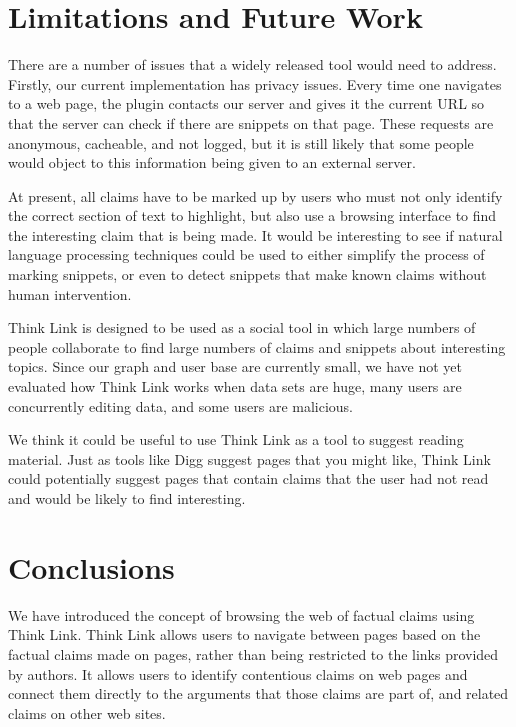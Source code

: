 \documentclass{chi2009}
\begin{document}
\section{Limitations and Future Work}

There are a number of issues that a widely released tool would need to address. Firstly, our current implementation has privacy issues. Every time one navigates to a web page, the plugin contacts our server and gives it the current URL so that the server can check if there are snippets on that page. These requests are anonymous, cacheable, and not logged, but it is still likely that some people would object to this information being given to an external server. 

At present, all claims have to be marked up by users who must not only identify the correct section of text to highlight, but also use a browsing interface to find the interesting claim that is being made. It would be interesting to see if natural language processing techniques could be used to either simplify the process of marking snippets, or even to detect snippets that make known claims without human intervention.

Think Link is designed to be used as a social tool in which large numbers of people collaborate to find large numbers of claims and snippets about interesting topics. Since our graph and user base are currently small, we have not yet evaluated how Think Link works when data sets are huge, many users are concurrently editing data, and some users are malicious.

We think it could be useful to use Think Link as a tool to suggest reading material. Just as tools like Digg suggest pages that you might like, Think Link could potentially suggest pages that contain claims that the user had not read and would be likely to find interesting.


\section{Conclusions}

We have introduced the concept of browsing the web of factual claims using Think Link. Think Link allows users to navigate between pages based on the factual claims made on pages, rather than being restricted to the links provided by authors. It allows users to identify contentious claims on web pages and connect them directly to the arguments that those claims are part of, and related claims on other web sites.
\end{document}
